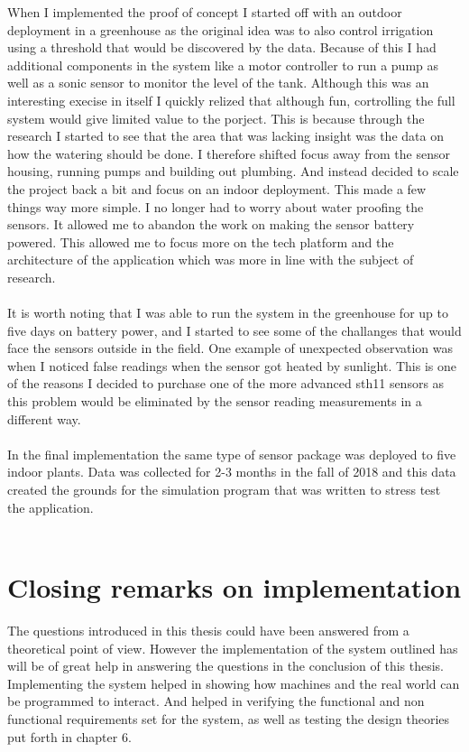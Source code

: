 \documentclass[]{uiophd}
\begin{document}
When I implemented the proof of concept I started off with an outdoor deployment in a greenhouse as the original idea was to also control irrigation using a threshold that would be discovered by the data. Because of this I had additional components in the system like a motor controller to run a pump as well as a sonic sensor to monitor the level of the tank. Although this was an interesting execise in itself I quickly relized that although fun, cortrolling the full system would give limited value to the porject. This is because through the research I started to see that the area that was lacking insight was the data on how the watering should be done. I therefore shifted focus away from the sensor housing, running pumps and building out plumbing. And instead decided to scale the project back a bit and focus on an indoor deployment. This made a few things way more simple. I no longer had to worry about water proofing the sensors. It allowed me to abandon the work on making the sensor battery powered. This allowed me to focus more on the tech platform and the architecture of the application which was more in line with the subject of research. 
\\\\
It is worth noting that I was able to run the system in the greenhouse for up to five days on battery power, and I started to see some of the challanges that would face the sensors outside in the field. One example of unexpected observation was when I noticed false readings when the sensor got heated by sunlight. This is one of the reasons I decided to purchase one of the more advanced sth11 sensors as this problem would be eliminated by the sensor reading measurements in a different way.
\\\\
In the final implementation the same type of sensor package was deployed to five indoor plants. Data was collected for 2-3 months in the fall of 2018 and this data created the grounds for the simulation program that was written to stress test the application.
\\\\
\section{Closing remarks on implementation}
The questions introduced in this thesis could have been answered from a theoretical point of view. However the implementation of the system outlined has will be of great help in answering the questions in the conclusion of this thesis. Implementing the system helped in showing how machines and the real world can be programmed to interact. And helped in verifying the functional and non functional requirements set for the system, as well as testing the design theories put forth in chapter 6.
\end{document}
